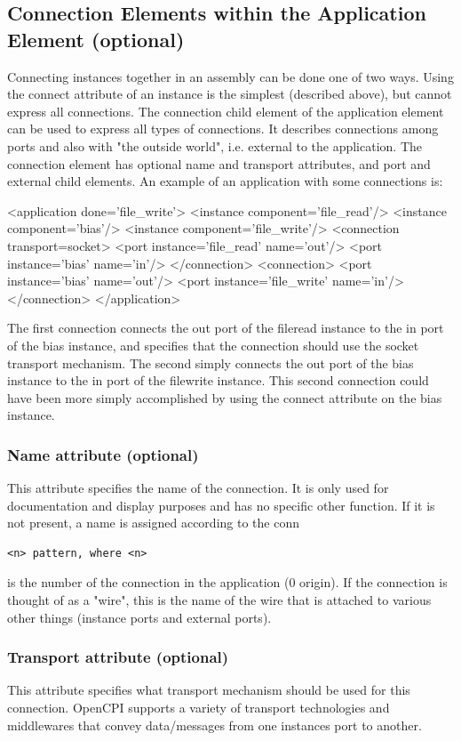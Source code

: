 \documentclass[10pt, a4paper, oneside]{article}
\renewcommand\_{\textunderscore\allowbreak} %
\begin{document}
\subsection{Connection Elements within the Application Element (optional)} Connecting instances together in an assembly can be done one of two ways. Using the connect attribute of an instance is the simplest (described above), but cannot express all connections. The connection child element of the application element can be used to express all types of connections.  It describes connections among ports and also with "the outside world", i.e. external to the application.  The connection element has optional name and transport attributes, and port and external child elements. An example of an application with some connections is:\begin{ocpixml}
    <application done='file_write'>
      <instance component='file_read'/>
      <instance component='bias'/>
      <instance component='file_write'/>
      <connection transport=socket>
           <port instance='file_read' name='out'/>
           <port instance='bias' name='in'/>
      </connection>
      <connection>
           <port instance='bias' name='out'/>
           <port instance='file_write' name='in'/>
      </connection>
    </application>\end{ocpixml}

The first connection connects the out port of the file\_read instance to the in port of the bias instance, and specifies that the connection should use the socket transport mechanism.  The second simply connects the out port of the bias instance to the in port of the file\_write instance. This second connection could have been more simply accomplished by using the connect attribute on the bias instance.
\subsubsection {Name attribute (optional)} This attribute specifies the name of the connection. It is only used for documentation and display purposes and has no specific other function.  If it is not present, a name is assigned according to the conn \begin{verbatim}<n> pattern, where <n> \end{verbatim}is the number of the connection in the application (0 origin).  If the connection is thought of as a "wire", this is the name of the wire that is attached to various other things (instance ports and external ports).
\subsubsection {Transport attribute (optional)}  This attribute specifies what transport mechanism should be used for this connection. OpenCPI supports a variety of transport technologies and middlewares that convey data/messages from one instances port to another. 
\end{document}
